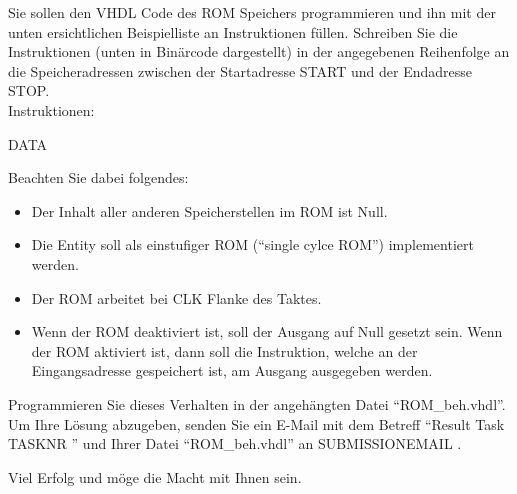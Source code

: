 \documentclass[a4paper,12pt]{article}
\begin{document}
Sie sollen den VHDL Code des ROM Speichers programmieren und ihn mit der unten ersichtlichen Beispielliste an Instruktionen f\"ullen. Schreiben Sie die Instruktionen (unten in Bin\"arcode dargestellt) in der angegebenen Reihenfolge an die Speicheradressen zwischen der Startadresse {{START}} und der Endadresse {{STOP}}.\\

Instruktionen:
\begin{center}
{{DATA}}\newline
\end{center}

Beachten Sie dabei folgendes:

\begin{itemize}
\item Der Inhalt aller anderen Speicherstellen im ROM ist Null.
\item Die Entity soll als einstufiger ROM ("`single cylce ROM"') implementiert werden.
\item Der ROM arbeitet bei {{CLK}} Flanke des Taktes.
\item Wenn der ROM deaktiviert ist, soll der Ausgang auf Null gesetzt sein. Wenn der ROM aktiviert ist, dann soll die Instruktion, welche an der Eingangsadresse gespeichert ist, am Ausgang ausgegeben werden.
\end{itemize}

Programmieren Sie dieses Verhalten in der angeh\"angten Datei "`ROM\_beh.vhdl"'.\\

Um Ihre L\"osung abzugeben, senden Sie ein E-Mail mit dem Betreff "`Result Task {{ TASKNR }}"' und Ihrer Datei "`ROM\_beh.vhdl"'  an {{ SUBMISSIONEMAIL }}.

\vspace{0.7cm}

Viel Erfolg und m\"oge die Macht mit Ihnen sein.
\end{document}
